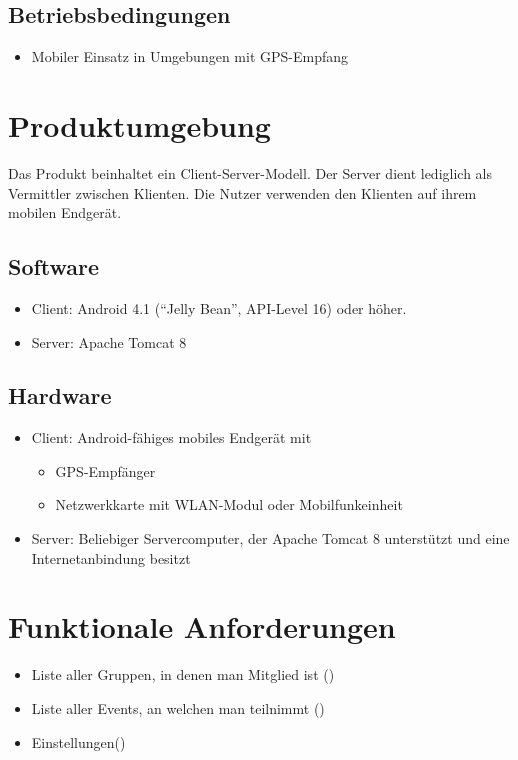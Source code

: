 \documentclass[parskip=full,11pt]{scrartcl}
\begin{document}
\subsection{Betriebsbedingungen}
\begin{itemize}
    \item Mobiler Einsatz in Umgebungen mit GPS-Empfang
\end{itemize}

\section{Produktumgebung}
Das Produkt beinhaltet ein Client-Server-Modell.
Der Server dient lediglich als Vermittler zwischen Klienten.
Die Nutzer verwenden den Klienten auf ihrem mobilen Endgerät.
\subsection{Software}
\begin{itemize}
    \item Client: Android 4.1 (\enquote{Jelly Bean}, API-Level 16) oder
        höher.
    \item Server: Apache Tomcat 8
\end{itemize}

\subsection{Hardware}
\begin{itemize}
    \item Client: Android-fähiges mobiles Endgerät mit
        \begin{itemize}
            \item GPS-Empfänger
            \item Netzwerkkarte mit WLAN-Modul oder Mobilfunkeinheit
        \end{itemize}
    \item Server: Beliebiger Servercomputer, der Apache Tomcat 8 unterstützt
        und eine Internetanbindung besitzt
\end{itemize}

\section{Funktionale Anforderungen}

\begin{itemize}
    \item Liste aller Gruppen, in denen man Mitglied ist ()
    \item Liste aller Events, an welchen man teilnimmt ()
    \item Einstellungen()
\end{itemize}
\end{document}
